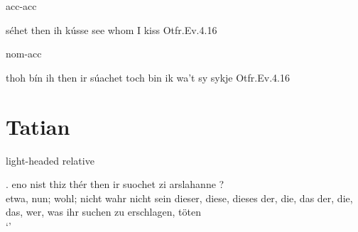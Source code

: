 
acc-acc

séhet	then	ih	kússe
see whom I kiss
Otfr.Ev.4.16


nom-acc

thoh	bín	ih	then	ir	súachet
toch bin ik wa't sy sykje
Otfr.Ev.4.16




\phantom{x}



\section{Tatian}

light-headed relative

\exg. eno	nist	thiz	thér	then	ir	suochet	zi	arslahanne	?\\
 etwa, nun; wohl; nicht wahr	nicht	sein	dieser, diese, dieses	der, die, das	der, die, das, wer, was	ihr	suchen	zu	erschlagen, töten\\
 `'

\phantom{x}

